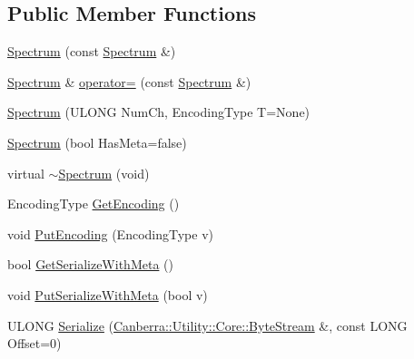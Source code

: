\subsection*{Public Member Functions}
\begin{DoxyCompactItemize}
\item 
\hyperlink{class_canberra_1_1_data_types_1_1_spectroscopy_1_1_spectrum_a1e31fc3ab2977d2db978b113f3da35d5_a1e31fc3ab2977d2db978b113f3da35d5}{Spectrum} (const \hyperlink{class_canberra_1_1_data_types_1_1_spectroscopy_1_1_spectrum}{Spectrum} \&)
\item 
\hyperlink{class_canberra_1_1_data_types_1_1_spectroscopy_1_1_spectrum}{Spectrum} \& \hyperlink{class_canberra_1_1_data_types_1_1_spectroscopy_1_1_spectrum_aed440d314387e7ccb55437bcf1921d48_aed440d314387e7ccb55437bcf1921d48}{operator=} (const \hyperlink{class_canberra_1_1_data_types_1_1_spectroscopy_1_1_spectrum}{Spectrum} \&)
\item 
\hyperlink{class_canberra_1_1_data_types_1_1_spectroscopy_1_1_spectrum_a149381355a41a677f924beef80dff323_a149381355a41a677f924beef80dff323}{Spectrum} (U\+L\+O\+NG Num\+Ch, Encoding\+Type T=None)
\item 
\hyperlink{class_canberra_1_1_data_types_1_1_spectroscopy_1_1_spectrum_ad79362c8a7ab8661e592bb4559969000_ad79362c8a7ab8661e592bb4559969000}{Spectrum} (bool Has\+Meta=false)
\item 
virtual \hyperlink{class_canberra_1_1_data_types_1_1_spectroscopy_1_1_spectrum_a9b7804a1f756950235bfdf6ca60f52fd_a9b7804a1f756950235bfdf6ca60f52fd}{$\sim$\+Spectrum} (void)
\item 
Encoding\+Type \hyperlink{class_canberra_1_1_data_types_1_1_spectroscopy_1_1_spectrum_aad961998d44cb34abbcdd78371035da6_aad961998d44cb34abbcdd78371035da6}{Get\+Encoding} ()
\item 
void \hyperlink{class_canberra_1_1_data_types_1_1_spectroscopy_1_1_spectrum_a1f70a5562746713d7705b93a006318cd_a1f70a5562746713d7705b93a006318cd}{Put\+Encoding} (Encoding\+Type v)
\item 
bool \hyperlink{class_canberra_1_1_data_types_1_1_spectroscopy_1_1_spectrum_a0e240aba7a870edd64b75329bf7ff628_a0e240aba7a870edd64b75329bf7ff628}{Get\+Serialize\+With\+Meta} ()
\item 
void \hyperlink{class_canberra_1_1_data_types_1_1_spectroscopy_1_1_spectrum_a44f21d401a3e75802cd994d1c8fb0b68_a44f21d401a3e75802cd994d1c8fb0b68}{Put\+Serialize\+With\+Meta} (bool v)
\item 
U\+L\+O\+NG \hyperlink{class_canberra_1_1_data_types_1_1_spectroscopy_1_1_spectrum_ac5f0fa880e88960afa1547a60ed8c8f4_ac5f0fa880e88960afa1547a60ed8c8f4}{Serialize} (\hyperlink{class_canberra_1_1_utility_1_1_core_1_1_byte_stream}{Canberra\+::\+Utility\+::\+Core\+::\+Byte\+Stream} \&, const L\+O\+NG Offset=0)

\end{DoxyCompactItemize}

